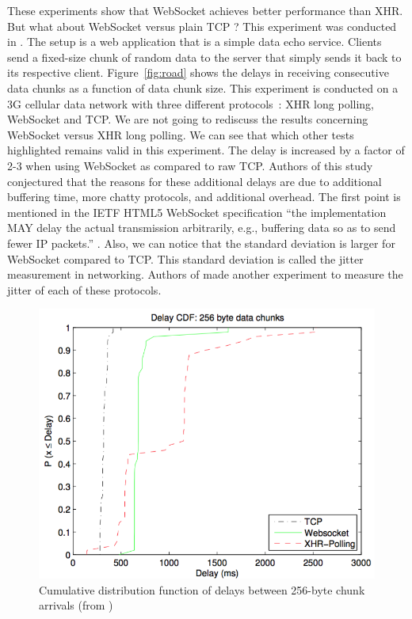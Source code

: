 \documentclass[10pt,journal,compsoc]{IEEEtran}
\newcommand{\ws}{WebSocket}
\begin{document}
These experiments show that \ws{} achieves better performance than XHR.
But what about \ws{} versus plain TCP ?
This experiment was conducted in \cite{roadblock}.
The setup is a web application that is a simple data echo service.
Clients send a fixed-size chunk of random data to the server that simply sends it back to its respective client.
Figure~\ref{fig:road} shows the delays in receiving consecutive data chunks as a function of data chunk size. %
This experiment is conducted on a 3G cellular data network with three different \mbox{protocols :} XHR long polling, \ws{} and TCP.
We are not going to rediscuss the results concerning \ws{} versus XHR long polling.
We can see that which other tests highlighted remains valid in this experiment. %
The delay is increased by a factor of 2-3 when using \ws{} as compared to raw TCP. %
Authors of this study conjectured that the reasons for these additional delays are due to additional buffering time, more chatty protocols, and additional overhead.
The first point is mentioned in the IETF HTML5 \ws{} specification ``the implementation MAY delay the actual transmission arbitrarily, e.g., buffering data so as to send fewer IP packets.'' \cite{rfc6455}.
Also, we can notice that the standard deviation is larger for \ws{} compared to TCP.
This standard deviation is called the jitter measurement in networking.
Authors of \cite{roadblock} made another experiment to measure the jitter of each of these protocols.
\begin{figure}[!ht]
    \centering
    \includegraphics[width=\linewidth]{road_jitter.png}
    \caption{Cumulative distribution function of delays between 256-byte chunk arrivals (from \cite{roadblock})}
    \label{fig:road2}
\end{figure}
\end{document}

